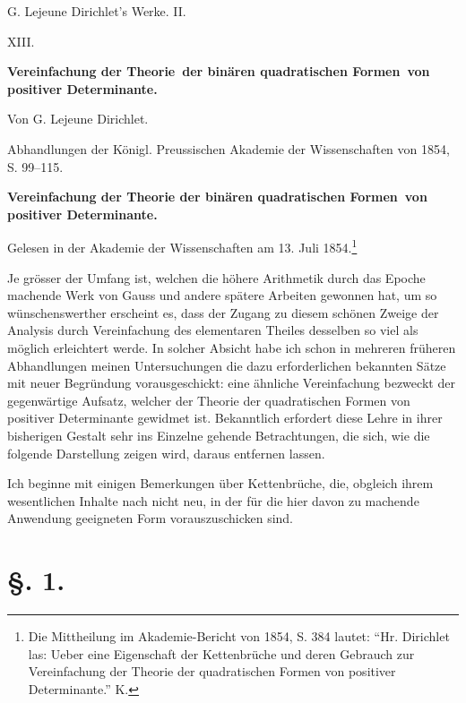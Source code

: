\documentclass[11pt]{article}
\begin{document}
\begin{center}
{\Large G. Lejeune Dirichlet's Werke. II.}\par\vspace{1.2em}
{\Large XIII.}\par\vspace{0.5em}
{\LARGE \textbf{Vereinfachung der Theorie\ der binären quadratischen Formen\ von positiver Determinante.}}\par\vspace{1em}
{\large Von G. Lejeune Dirichlet.}\par\vspace{0.5em}
{\small Abhandlungen der Königl. Preussischen Akademie der Wissenschaften von 1854, S. 99--115.}
\end{center}

\begin{center}
{\large \textbf{Vereinfachung der Theorie der binären quadratischen Formen\ von positiver Determinante.}}\par
{\small Gelesen in der Akademie der Wissenschaften am 13. Juli 1854.\footnote{Die Mittheilung im Akademie-Bericht von 1854, S. 384 lautet: ``Hr. Dirichlet las: Ueber eine Eigenschaft der Kettenbrüche und deren Gebrauch zur Vereinfachung der Theorie der quadratischen Formen von positiver Determinante.'' K.}}
\end{center}

Je grösser der Umfang ist, welchen die höhere Arithmetik durch das Epoche machende Werk von Gauss und andere spätere Arbeiten gewonnen hat, um so wünschenswerther erscheint es, dass der Zugang zu diesem schönen Zweige der Analysis durch Vereinfachung des elementaren Theiles desselben so viel als möglich erleichtert werde. In solcher Absicht habe ich schon in mehreren früheren Abhandlungen meinen Untersuchungen die dazu erforderlichen bekannten Sätze mit neuer Begründung vorausgeschickt: eine ähnliche Vereinfachung bezweckt der gegenwärtige Aufsatz, welcher der Theorie der quadratischen Formen von positiver Determinante gewidmet ist. Bekanntlich erfordert diese Lehre in ihrer bisherigen Gestalt sehr ins Einzelne gehende Betrachtungen, die sich, wie die folgende Darstellung zeigen wird, daraus entfernen lassen.

Ich beginne mit einigen Bemerkungen über Kettenbrüche, die, obgleich ihrem wesentlichen Inhalte nach nicht neu, in der für die hier davon zu machende Anwendung geeigneten Form vorauszuschicken sind.

\section*{\S. 1.}
\end{document}
